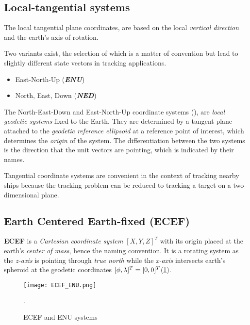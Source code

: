 \subsection{Local-tangential systems}

The local tangential plane coordinates, are based on the local \emph{vertical direction} and the earth's axis of rotation.

Two variants exist, the selection of which is a matter of convention but lead to slightly different state vectors in tracking applications.



\begin{itemize}
	\item East-North-Up (\textbf{\emph{ENU}})
	\item North, East, Down (\textbf{\emph{NED}})
\end{itemize}

The North-East-Down and East-North-Up coordinate systems (), are \emph{local geodetic systems} fixed to the Earth. They are determined by a tangent plane attached to the \emph{geodetic reference ellipsoid} at a reference point of interest, which determines the \emph{origin} of the system. The differentiation between the two systems is the direction that the unit vectors are pointing, which is indicated by their names.


Tangential coordinate systems are convenient in the context of tracking nearby ships because the tracking problem can be reduced to tracking a target on a two-dimensional plane.


\subsection{Earth Centered Earth-fixed (ECEF)}

\textbf{ECEF} is a \emph{Cartesian coordinate system} $[X,Y,Z]^T$ with its origin placed at the earth's \emph{center of mass}, hence the naming convention. It is a rotating system as the \emph{z-axis} is pointing through \emph{true north} while the \emph{x-axis} intersects earth's spheroid at the geodetic coordinates $[\phi,{\lambda}]^{T} =  [0,0]^{T}$(\cref{fig:ECEF_ENU}).


\begin{figure}[H]
	\centering
	\texttt{[image: ECEF\_ENU.png]}
	\caption{ECEF and ENU systems \cite{WikipediaENUFig}}.
\label{fig:ECEF_ENU}
\end{figure}


